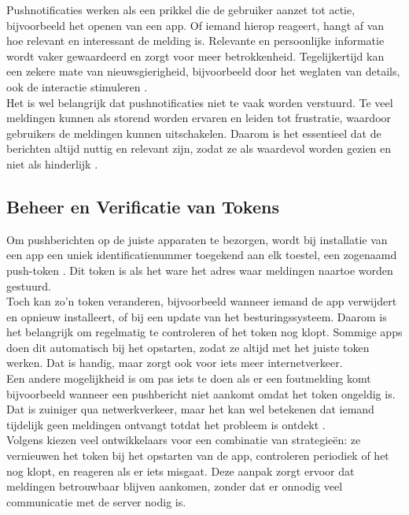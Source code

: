 Pushnotificaties werken als een prikkel die de gebruiker aanzet tot actie, bijvoorbeeld het openen van een app. Of iemand hierop reageert, hangt af van hoe relevant en interessant de melding is. Relevante en persoonlijke informatie wordt vaker gewaardeerd en zorgt voor meer betrokkenheid. Tegelijkertijd kan een zekere mate van nieuwsgierigheid, bijvoorbeeld door het weglaten van details, ook de interactie stimuleren \autocite{Wohllebe2021}.\\

Het is wel belangrijk dat pushnotificaties niet te vaak worden verstuurd. Te veel meldingen kunnen als storend worden ervaren en leiden tot frustratie, waardoor gebruikers de meldingen kunnen uitschakelen. Daarom is het essentieel dat de berichten altijd nuttig en relevant zijn, zodat ze als waardevol worden gezien en niet als hinderlijk \autocite{Wohllebe2021}.\\

\subsection{Beheer en Verificatie van Tokens}
Om pushberichten op de juiste apparaten te bezorgen, wordt bij installatie van een app een uniek identificatienummer toegekend aan elk toestel, een zogenaamd push-token \textcite{pushwoosh2025}. Dit token is als het ware het adres waar meldingen naartoe worden gestuurd.\\

Toch kan zo’n token veranderen, bijvoorbeeld wanneer iemand de app verwijdert en opnieuw installeert, of bij een update van het besturingssysteem. Daarom is het belangrijk om regelmatig te controleren of het token nog klopt. Sommige apps doen dit automatisch bij het opstarten, zodat ze altijd met het juiste token werken. Dat is handig, maar zorgt ook voor iets meer internetverkeer.\\

Een andere mogelijkheid is om pas iets te doen als er een foutmelding komt bijvoorbeeld wanneer een pushbericht niet aankomt omdat het token ongeldig is. Dat is zuiniger qua netwerkverkeer, maar het kan wel betekenen dat iemand tijdelijk geen meldingen ontvangt totdat het probleem is ontdekt \autocite{pushwoosh2025}.\\

Volgens \textcite{pushwoosh2025} kiezen veel ontwikkelaars voor een combinatie van strategieën: ze vernieuwen het token bij het opstarten van de app, controleren periodiek of het nog klopt, en reageren als er iets misgaat. Deze aanpak zorgt ervoor dat meldingen betrouwbaar blijven aankomen, zonder dat er onnodig veel communicatie met de server nodig is.\\

